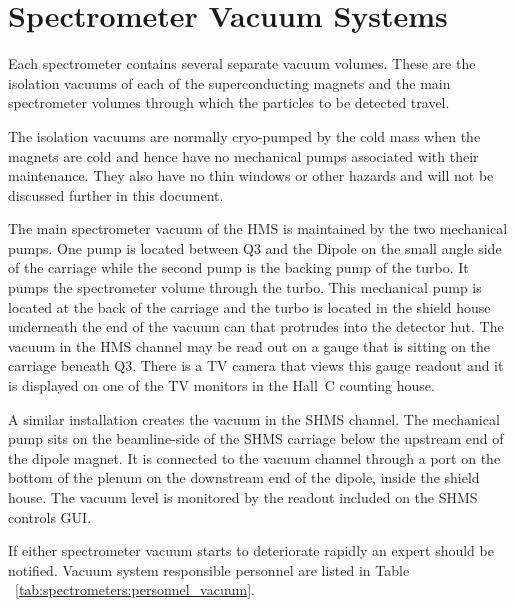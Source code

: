 
\section{Spectrometer Vacuum Systems}

	Each spectrometer contains several separate vacuum volumes.
These are the isolation vacuums of each of the superconducting
magnets and the main spectrometer volumes through which the particles
to be detected travel.

The isolation vacuums are normally cryo-pumped by the cold mass when the
magnets are cold and hence have no mechanical pumps
associated with their maintenance. They also have no thin
windows or other hazards and will not be discussed further in this document.

The main spectrometer vacuum of the HMS
is maintained by the two mechanical pumps.
One pump is located between Q3 and the Dipole on the small angle
side of the carriage while the second pump is the backing
pump of the turbo. It pumps the spectrometer volume through the turbo.
This mechanical pump is located
at the back of the carriage and the turbo is located in the shield house
underneath the end of the vacuum can that protrudes into the detector hut.
The vacuum in the HMS channel may be read out on a gauge that is sitting on the
carriage beneath Q3. There is a TV camera that views this gauge readout and
it is displayed on one of the TV monitors  in the Hall~C counting house.

A similar installation creates the vacuum in the SHMS channel. The mechanical
pump sits on the beamline-side of the SHMS carriage below the
upstream end of the dipole magnet. It is connected to the vacuum channel
through a port on the bottom of the plenum on the downstream end of the
dipole, inside the shield house. The vacuum level is monitored by the
readout included on the SHMS controls GUI.

If either spectrometer vacuum starts to deteriorate rapidly an expert should be notified.
Vacuum system responsible personnel are listed in Table ~\ref{tab:spectrometers:personnel_vacuum}.



